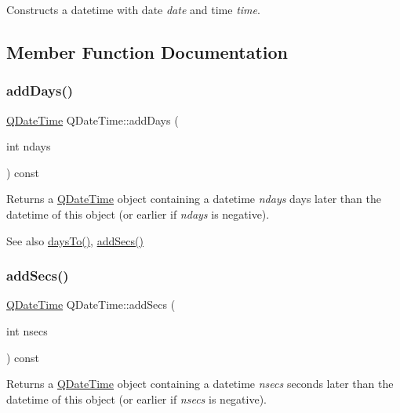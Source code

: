 Constructs a datetime with date {\itshape date} and time {\itshape time}. 

\subsection{Member Function Documentation}
\mbox{\label{class_q_date_time_adeea3cac98a8c074fecf486094a9bbaf}} 
\subsubsection{\texorpdfstring{addDays()}{addDays()}}
{\footnotesize\ttfamily \mbox{\hyperlink{class_q_date_time}{Q\+Date\+Time}} Q\+Date\+Time\+::add\+Days (\begin{DoxyParamCaption}\item[{int}]{ndays }\end{DoxyParamCaption}) const}

Returns a \mbox{\hyperlink{class_q_date_time}{Q\+Date\+Time}} object containing a datetime {\itshape ndays} days later than the datetime of this object (or earlier if {\itshape ndays} is negative).

\begin{DoxySeeAlso}{See also}
\mbox{\hyperlink{class_q_date_time_a80a194c8ecef4133a9bff3aeb4546934}{days\+To()}}, \mbox{\hyperlink{class_q_date_time_a7b48ae870775460aec8791465c2e5056}{add\+Secs()}} 
\end{DoxySeeAlso}
\mbox{\label{class_q_date_time_a7b48ae870775460aec8791465c2e5056}} 
\subsubsection{\texorpdfstring{addSecs()}{addSecs()}}
{\footnotesize\ttfamily \mbox{\hyperlink{class_q_date_time}{Q\+Date\+Time}} Q\+Date\+Time\+::add\+Secs (\begin{DoxyParamCaption}\item[{int}]{nsecs }\end{DoxyParamCaption}) const}

Returns a \mbox{\hyperlink{class_q_date_time}{Q\+Date\+Time}} object containing a datetime {\itshape nsecs} seconds later than the datetime of this object (or earlier if {\itshape nsecs} is negative).

